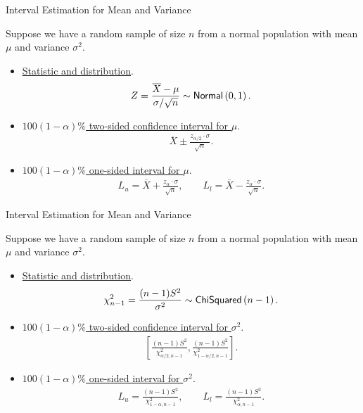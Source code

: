 \begin{frame}{Interval Estimation for Mean and Variance}

\justifying
{} Suppose we have a random sample of size $n$ from a normal population with  mean $\mu$ and  variance $\sigma^2$.
\begin{itemize}
	\item \underline{Statistic and distribution}.
	\begin{align*}
	Z = \frac{\overline{X} - \mu}{\sigma / \sqrt{n}} \sim \mathsf{Normal}\left(0, 1 \right).
	\end{align*}
	\item \underline{$100(1-\alpha)\%$ two-sided confidence interval for $\mu$}.
	\begin{align*}
	\overline{X} \pm \frac{z_{\alpha/2}\cdot\sigma}{\sqrt{n}}.
	\end{align*}
	\item \underline{$100(1-\alpha)\%$ one-sided interval for $\mu$}.
	\begin{align*}
	L_u = \overline{X} + \frac{z_{\alpha}\cdot\sigma}{\sqrt{n}}, \qquad L_l = \overline{X} - \frac{z_{\alpha}\cdot \sigma}{\sqrt{n}}.
	\end{align*}
\end{itemize}

\end{frame}


\begin{frame}{Interval Estimation for Mean and Variance}

\justifying
{} Suppose we have a random sample of size $n$ from a normal population with  mean $\mu$ and  variance $\sigma^2$.
\begin{itemize}
	\item \underline{Statistic and distribution}.
	\begin{align*}
	\chi_{n-1}^2 = \frac{(n-1)S^2}{\sigma^2} \sim \mathsf{ChiSquared}\left(n-1 \right).
	\end{align*}
	\item \underline{$100(1-\alpha)\%$ two-sided confidence interval for $\sigma^2$}.
	\begin{align*}
	\left[\frac{(n-1)S^2}{\chi_{\alpha/2, n-1}^2}, \frac{(n-1)S^2}{\chi_{1-\alpha/2, n-1}^2} \right].
	\end{align*}
	\item \underline{$100(1-\alpha)\%$ one-sided interval for $\sigma^2$}.
	\begin{align*}
	L_u = \frac{(n-1)S^2}{\chi_{1-\alpha, n-1}^2}, \qquad L_l = \frac{(n-1)S^2}{\chi_{\alpha, n-1}^2}.
	\end{align*}
\end{itemize}

\end{frame}


